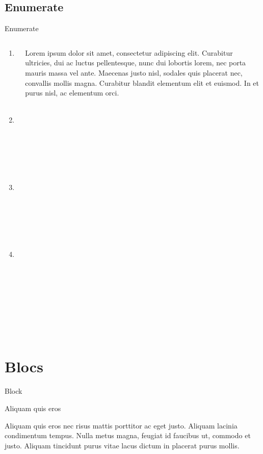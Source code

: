 \documentclass{beamer}
\begin{document}
\subsection{Enumerate}
\begin{frame}{Enumerate}
\begin{columns}
  \begin{column}{0.49\paperwidth}
      \begin{enumerate}
        \item Lorem ;
        \item<2-> Ipsum ;
        \item<2-> Dolor ;
        \item<2-> Sit amet.
      \end{enumerate}
  \end{column}

  \begin{column}{0.49\paperwidth}
    Lorem ipsum dolor sit amet, consectetur adipiscing elit. Curabitur
    ultricies, dui ac luctus pellentesque, nunc dui lobortis lorem, nec
    porta mauris massa vel ante. Maecenas justo nisl, sodales quis
    placerat nec, convallis mollis magna. Curabitur blandit elementum
    elit et euismod. In et purus nisl, ac elementum orci.
  \end{column}
\end{columns}

\end{frame}

\section{Blocs}
\begin{frame}{}
\end{frame}

\begin{frame}{Block}
  \begin{block}{Aliquam quis eros}

    Aliquam quis eros nec risus mattis porttitor ac eget justo.
    Aliquam lacinia condimentum tempus. Nulla metus magna, feugiat
    id faucibus ut, commodo et justo. Aliquam tincidunt purus vitae
    lacus dictum in placerat purus mollis.

  \end{block}
\end{frame}
\end{document}
